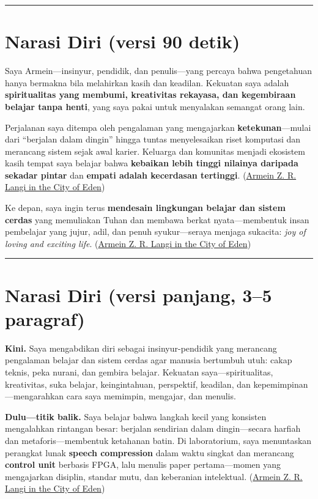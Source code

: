 \documentclass[
  letterpaper,
  DIV=11,
  numbers=noendperiod]{scrreprt}
\begin{document}
\begin{center}\rule{0.5\linewidth}{0.5pt}\end{center}

\section{Narasi Diri (versi 90 detik)}\label{narasi-diri-versi-90-detik}

Saya Armein---insinyur, pendidik, dan penulis---yang percaya bahwa
pengetahuan hanya bermakna bila melahirkan kasih dan keadilan. Kekuatan
saya adalah \textbf{spiritualitas yang membumi, kreativitas rekayasa,
dan kegembiraan belajar tanpa henti}, yang saya pakai untuk menyalakan
semangat orang lain.

Perjalanan saya ditempa oleh pengalaman yang mengajarkan
\textbf{ketekunan}---mulai dari ``berjalan dalam dingin'' hingga tuntas
menyelesaikan riset komputasi dan merancang sistem sejak awal karier.
Keluarga dan komunitas menjadi ekosistem kasih tempat saya belajar bahwa
\textbf{kebaikan lebih tinggi nilainya daripada sekadar pintar} dan
\textbf{empati adalah kecerdasan tertinggi}.
(\href{https://azrl.wordpress.com/?utm_source=chatgpt.com}{Armein Z. R.
Langi in the City of Eden})

Ke depan, saya ingin terus \textbf{mendesain lingkungan belajar dan
sistem cerdas} yang memuliakan Tuhan dan membawa berkat
nyata---membentuk insan pembelajar yang jujur, adil, dan penuh
syukur---seraya menjaga sukacita: \emph{joy of loving and exciting
life}. (\href{https://azrl.wordpress.com/?utm_source=chatgpt.com}{Armein
Z. R. Langi in the City of Eden})

\begin{center}\rule{0.5\linewidth}{0.5pt}\end{center}

\section{Narasi Diri (versi panjang, 3--5
paragraf)}\label{narasi-diri-versi-panjang-35-paragraf}

\textbf{Kini.} Saya mengabdikan diri sebagai insinyur-pendidik yang
merancang pengalaman belajar dan sistem cerdas agar manusia bertumbuh
utuh: cakap teknis, peka nurani, dan gembira belajar. Kekuatan
saya---spiritualitas, kreativitas, suka belajar, keingintahuan,
perspektif, keadilan, dan kepemimpinan---mengarahkan cara saya memimpin,
mengajar, dan menulis.

\textbf{Dulu---titik balik.} Saya belajar bahwa langkah kecil yang
konsisten mengalahkan rintangan besar: berjalan sendirian dalam
dingin---secara harfiah dan metaforis---membentuk ketahanan batin. Di
laboratorium, saya menuntaskan perangkat lunak \textbf{speech
compression} dalam waktu singkat dan merancang \textbf{control unit}
berbasis FPGA, lalu menulis paper pertama---momen yang mengajarkan
disiplin, standar mutu, dan keberanian intelektual.
(\href{https://azrl.wordpress.com/?utm_source=chatgpt.com}{Armein Z. R.
Langi in the City of Eden})
\end{document}
